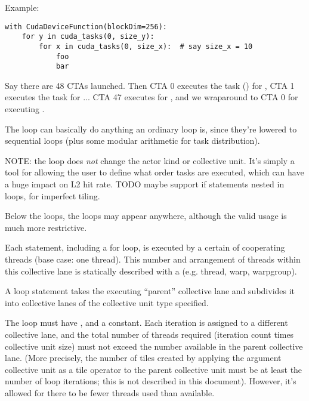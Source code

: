 \filbreak
Example:
{\color{lightttColor}
\begin{verbatim}
with CudaDeviceFunction(blockDim=256):
    for y in cuda_tasks(0, size_y):
        for x in cuda_tasks(0, size_x):  # say size_x = 10
            foo
            bar
\end{verbatim}
}
Say there are 48 CTAs launched.
Then CTA 0 executes the task () for , CTA 1 executes the task for  ... CTA 47 executes for , and we wraparound to CTA 0 for executing .

\filbreak
The  loop can basically do anything an ordinary  loop is, since they're lowered to sequential loops (plus some modular arithmetic for task distribution).

\filbreak
NOTE: the  loop does \textit{not} change the actor kind or collective unit.
It's simply a tool for allowing the user to define what order tasks are executed, which can have a huge impact on L2 hit rate.
TODO maybe support if statements nested in  loops, for imperfect tiling.

\filbreak
{} Below the  loops, the  loops may appear anywhere, although the valid usage is much more restrictive.

Each statement, including a for loop, is executed by a certain  of cooperating threads (base case: one thread).
This number and arrangement of threads within this collective lane is statically described with a  (e.g. thread, warp, warpgroup).

\filbreak
A  loop statement takes the executing ``parent'' collective lane and subdivides it into collective lanes of the collective unit type specified.

\filbreak
The loop must have , and  a constant.
Each iteration is assigned to a different collective lane, and the total number of threads required (iteration count times collective unit size) must not exceed the number available in the parent collective lane.
(More precisely, the number of tiles created by applying the argument collective unit as a tile operator to the parent collective unit must be at least the number of loop iterations; this is not described in this document).
However, it's allowed for there to be fewer threads used than available.

